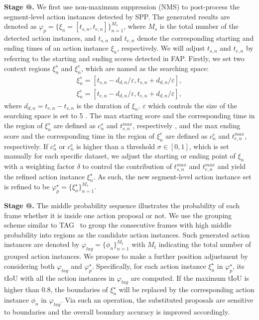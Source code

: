 \documentclass[10pt,twocolumn,letterpaper]{article}
\makeatletter
\newcommand*{\rom}[1]{\expandafter\@slowromancap\romannumeral #1@}
\makeatother
\begin{document}
\textbf{Stage \rom{1}.} We first use non-maximum suppression (NMS) to post-process the segment-level action instances detected by SPP. The generated results are denoted as $\varphi_{p}=\{\xi_{n}=[t_{s,n},t_{e,n}] \}_{n=1}^{M_{s}}$, where $M_{s}$ is the total number of the detected action instances, and $t_{s,n}$ and $t_{e,n}$ denote the corresponding starting and ending times of an action instance $\xi_{n}$, respectively. We will adjust $t_{s,n}$ and $t_{e,n}$ by referring to the starting and ending scores detected in FAP. Firstly, we set two context regions $\xi_{n}^{s}$ and $\xi_{n}^{e}$, which are named as the searching space:
\begin{equation}
\begin{split}
\xi_{n}^{s}= [t_{s,n}-d_{d,n}/\varepsilon ,t_{s,n}+d_{d,n}/\varepsilon ],\\
\xi_{n}^{e}= [t_{e,n}-d_{d,n}/\varepsilon ,t_{e,n}+d_{d,n}/\varepsilon ],
\end{split}
\end{equation}
where $d_{d,n}=t_{e,n}-t_{s,n}$ is the duration of $\xi_{n}$. $\varepsilon$ which controls the size of the searching space is set to 5 . The max starting score and the corresponding time in the region of $\xi_{n}^{s}$ are defined as $c_{n}^{s}$ and $t_{s,n}^{max}$, respectively , and the max ending score and the corresponding time in the region of $\xi_{n}^{e}$ are defined as $c_{n}^{e}$ and $t_{e,n}^{max}$, respectively. If $c_{n}^{s}$ or $c_{n}^{e}$ is higher than a threshold $\sigma\in\left[0,1\right]$, which is set manually for each specific dataset, we adjust the starting or ending point of $\xi_{n}$ with a weighting factor $\delta$ to control the contribution of $t_{s,n}^{max}$ and $t_{e,n}^{max}$ and yield the refined action instance $\xi_{n}^{\star}$. 
As such, the new  segment-level action instance set is refined to be  $\varphi_{p}^{\star}=\{\xi_{n}^{\star}\}_{n=1}^{M_{s}}$.



\textbf{Stage \rom{2}.} The middle probability sequence illustrates the probability of each frame whether it is inside one action proposal or not. We use the grouping scheme similar to TAG~\cite{TAG} to group the consecutive frames with high middle probability into regions as the candidate action instances. Such generated action instances are denoted by $\varphi_{tag}=\{\phi_{n}\}_{n=1}^{M_{t}}$ with $M_{t}$ indicating the total number of grouped action instances. We propose to make a further position adjustment by considering both  $\varphi_{tag}$ and  $\varphi_{p}^{\star}$.  Specifically, for each action instance $\xi_{n}^{\star}$ in $\varphi_{p}^{\star}$, its tIoU with all the action instances in $\varphi_{tag}$ are computed. If the maximum tIoU is higher than 0.8, the boundaries of $\xi_{n}^{\star}$ will be replaced by the corresponding action instance $\phi_{n}$ in $\varphi_{tag}$. Via such an operation, the substituted proposals are sensitive to boundaries and the overall boundary accuracy is improved accordingly.
\end{document}
